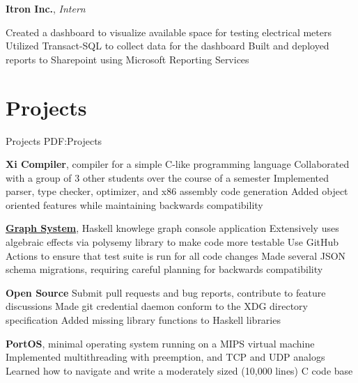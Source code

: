 \documentclass[letterpaper,10pt,oneside]{simpleresume}
\newcommand{\JobHeading}[3]{%
#1
\hfill
\pbox[t][0pt]{\textwidth}{%
\minibox[t,r]{%
#2 \\
#3
}
}
}
\begin{document}
\begin{minipage}[t][0pt]{\linewidth}
\begin{body}
\JobHeading%
{\textbf{Itron Inc.}, \emph{Intern}}
{\DatestampYMD{2017}{06}{23} --- \DatestampYMD{2017}{08}{18}}
{Oconee, SC}
\BulletItem%
Created a dashboard to visualize available space for testing electrical meters
\BulletItem%
Utilized Transact-SQL to collect data for the dashboard
\BulletItem%
Built and deployed reports to Sharepoint using Microsoft Reporting Services


\section%
{Projects}
{Projects}
{PDF:Projects}

\textbf{Xi Compiler}, compiler for a simple C-like programming language
\BulletItem%
Collaborated with a group of 3 other students over the course of a semester
\BulletItem%
Implemented parser, type checker, optimizer, and x86 assembly code generation
\BulletItem%
Added object oriented features while maintaining backwards compatibility
\GapNoBreak%

\href{https://github.com/lehmacdj/graph}{\textbf{Graph System}},
Haskell knowlege graph console application
\BulletItem%
Extensively uses algebraic effects via polysemy library to make code more testable
\BulletItem%
Use GitHub Actions to ensure that test suite is run for all code changes
\BulletItem%
Made several JSON schema migrations, requiring careful planning for backwards compatibility
\GapNoBreak%

\textbf{Open Source}
\BulletItem%
Submit pull requests and bug reports, contribute to feature discussions
\BulletItem%
Made git credential daemon conform to the XDG directory specification
\BulletItem%
Added missing library functions to Haskell libraries
\GapNoBreak%

\textbf{PortOS}, minimal operating system running on a MIPS virtual machine
\BulletItem%
Implemented multithreading with preemption, and TCP and UDP analogs
\BulletItem%
Learned how to navigate and write a moderately sized (10,000 lines) C code base
\GapNoBreak%


\end{body}
\end{minipage}
\end{document}
